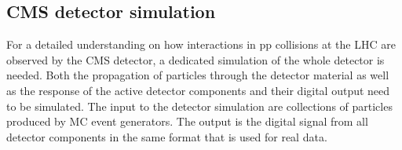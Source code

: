 
\subsection{CMS detector simulation}\label{subsec:fullSim}

For a detailed understanding on how interactions in pp collisions at the LHC are observed by the CMS detector, a dedicated simulation of the whole detector is needed.
Both the propagation of particles through the detector material as well as the response of the active detector components and their digital output need to be simulated.
The input to the detector simulation are collections of particles produced by MC event generators. The output is the digital signal from all detector components in the same format that is used for real data.

